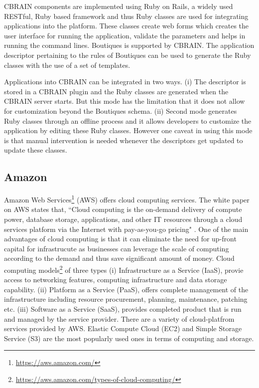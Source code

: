 CBRAIN components are implemented using Ruby on Rails, a widely used RESTful, Ruby based framework and thus Ruby classes are used for integrating applications into the platform. These classes create web forms which creates the user interface for running the application, validate the parameters and helps in running the command lines. Boutiques is supported by CBRAIN. The application descriptor pertaining to the rules of Boutiques can be used to generate the Ruby classes with the use of a set of templates.

Applications into CBRAIN can be integrated in two ways. (i) The descriptor is stored in a CBRAIN plugin and the Ruby classes are generated when the CBRAIN server starts. But this mode has the limitation that it does not allow for customization beyond the Boutiques schema. (ii) Second mode generates Ruby classes through an offline process and it allows developers to customize the application by editing these Ruby classes. However one caveat in using this mode is that manual intervention is needed whenever the descriptors get updated to update these classes.
 
\subsection{Amazon}
Amazon Web Services\footnote{\url{https://aws.amazon.com/}} (AWS) offers cloud computing services. The white paper on AWS \cite{Amazon-Web-Services} states that, ``Cloud computing is the on-demand delivery of compute power, database storage, applications, and other IT resources through a cloud services platform via the Internet with pay-as-you-go pricing" \cite{Amazon-Web-Services}. One of the main advantages of cloud computing is that it can eliminate the need for up-front capital for infrastrucute as businesses can leverage the scale of computing according to the demand and thus save significant amount of money. Cloud computing models\footnote{\url{https://aws.amazon.com/types-of-cloud-computing/}} of three types (i) Infrastructure as a Service (IaaS), provie access to networking features, computing infrastructure and data storage capability. (ii) Platform as a Service (PaaS), offers complete management of the infrastructure including resource procurement, planning, maintenance, patching etc. (iii) Software as a Service (SaaS), provides completed product that is run and managed by the service provider. There are a variety of cloud-platfrom services provided by AWS. Elastic Compute Cloud (EC2) and Simple Storage Service (S3) are the most popularly used ones in terms of computing and storage.

